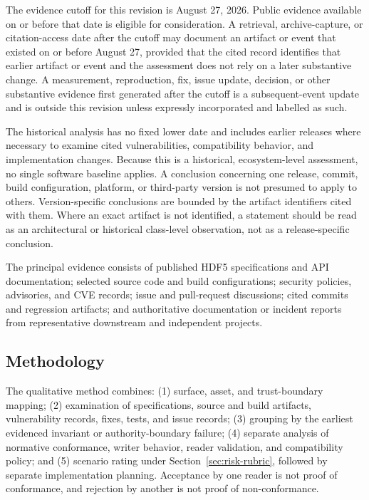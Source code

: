 \documentclass[../main.tex]{subfiles}
\begin{document}
The evidence cutoff for this revision is August 27, 2026. Public evidence
available on or before that date is eligible for consideration. A retrieval,
archive-capture, or citation-access date after the cutoff may document an
artifact or event that existed on or before August 27, provided that the cited
record identifies that earlier artifact or event and the assessment does not
rely on a later substantive change. A measurement, reproduction, fix, issue
update, decision, or other substantive evidence first generated after the
cutoff is a subsequent-event update and is outside this revision unless
expressly incorporated and labelled as such.

The historical analysis has no fixed lower date and includes earlier releases
where necessary to examine cited vulnerabilities, compatibility behavior, and
implementation changes. Because this is a historical, ecosystem-level
assessment, no single software baseline applies. A conclusion concerning one
release, commit, build configuration, platform, or third-party version is not
presumed to apply to others. Version-specific conclusions are bounded by the
artifact identifiers cited with them. Where an exact artifact is not identified,
a statement should be read as an architectural or historical class-level
observation, not as a release-specific conclusion.

The principal evidence consists of published HDF5 specifications and API
documentation; selected source code and build configurations; security policies,
advisories, and CVE records; issue and pull-request discussions; cited commits
and regression artifacts; and authoritative documentation or incident reports
from representative downstream and independent projects.

\subsection{Methodology}
\label{sec:assessment-methodology}

The qualitative method combines: (1) surface, asset, and trust-boundary mapping;
(2) examination of specifications, source and build artifacts, vulnerability
records, fixes, tests, and issue records; (3) grouping by the earliest evidenced
invariant or authority-boundary failure; (4) separate analysis of normative
conformance, writer behavior, reader validation, and compatibility policy; and
(5) scenario rating under Section~\ref{sec:risk-rubric}, followed by separate
implementation planning. Acceptance by one reader is not proof of conformance,
and rejection by another is not proof of non-conformance.
\end{document}

